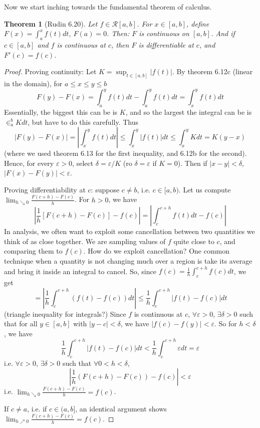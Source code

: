 \documentclass{article}
\theoremstyle{plain}
\newtheorem{theorem}{Theorem}
\theoremstyle{remark}
\newcommand{\ep}{{\varepsilon}}
\begin{document}
Now we start inching towards the fundamental theorem of calculus.
\begin{theorem}[Rudin 6.20]
	Let $f \in \mathcal{R}[a,b]$.
	For $x \in [a,b]$, define $F(x) = \int_a^x f(t)dt$, $F(a) = 0$.
	Then: $F$ is continuous on $[a,b]$.
	And if $c \in [a,b]$ and $f$ is continuous at $c$,
	then $F$ is differentiable at $c$,
	and $F'(c) = f(c)$.
\end{theorem}
\begin{proof}
	Proving continuity: Let $K = \sup_{t\in[a,b]}\lvert f(t) \rvert$.
	By theorem 6.12c (linear in the domain), for $a \leq x \leq y \leq b$
	\[
		F(y) - F(x) = \int_a^y f(t)dt - \int_a^y f(t)dt
		= \int_x^y f(t)dt
	\]
	Essentially, the biggest this can be is $K$,
	and so the largest the integral can be is $\in_a^b K dt$,
	but have to do this carefully.
	Thus
	\[
		\lvert F(y) - F(x) \rvert = \left\lvert \int_x^y f(t)dt \right\rvert
		\leq \int_x^y \lvert f(t)\rvert dt \leq \int_x^y Kdt = K(y-x)
	\]
	(where we used theorem 6.13 for the first inequality, and 6.12b for the second).
	Hence, for every $\ep > 0$, select $\delta = \ep/K$ (ro $\delta = \ep$ if $K=0$).
	Then if $\lvert x - y \rvert < \delta$,
	$\lvert F(x) - F(y) \rvert < \ep$.

	Proving differentiability at $c$:
	suppose $c \neq b$, i.e. $c \in [a,b)$.
	Let us compute $\lim_{h \searrow 0} \frac{F(c+h) - F(c)}{h}$.
	For $h > 0$, we have
	\[
		\left\lvert\frac{1}{h}[F(c+h) - F(c)] - f(c)\right\rvert
		= \left\lvert\int_c^{c+h}f(t)dt - f(c) \right\rvert
	\]
	In analysis, we often want to exploit some cancellation between
	two quantities we think of as close together.
	We are sampling values of $f$ quite close to $c$,
	and comparing them to $f(c)$.
	How do we exploit cancellation?
	One common technique when a quantity is not changing much over
	a region is take its average and bring it inside an integral to cancel.
	So, since $f(c) = \frac{1}{h}\int_c^{c+h} f(c)dt$, we get
	\[
		= \left\lvert \frac{1}{h} \int_c^{c+h} (f(t) - f(c))dt\right\rvert
		\leq \frac{1}{h} \int_c^{c+h} \lvert f(t) - f(c) \rvert dt
	\]
	(triangle inequality for integrals?)
	Since $f$ is continuous at $c$, $\forall \ep > 0$,
	$\exists \delta > 0$ such that for all $y \in [a,b]$ with $|y-c| < \delta$,
	we have $\lvert f(c) - f(y)\rvert < \ep$.
	So for $h < \delta$, we have
	\[
		\frac{1}{h}\int_c^{c+h} \lvert f(t) - f(c) \rvert dt
		< \frac{1}{h} \int_c^{c+h} \ep dt = \ep
	\]
	i.e. $\forall \ep > 0$, $\exists \delta > 0$ such that $\forall 0 < h < \delta$,
	\[
		\left\lvert \frac{1}{h} \left( F(c+h) - F(c)\right) - f(c) \right\rvert < \ep
	\]
	i.e. $\lim_{h \searrow 0} \frac{F(c+h) - F(c)}{h} = f(c)$.

	If $c \neq a$, i.e. if $c \in (a,b]$,
	an identical argument shows
	$\lim_{h \nearrow 0}\frac{F(c+h)-F(c)}{h} = f(c)$.
\end{proof}
\end{document}
